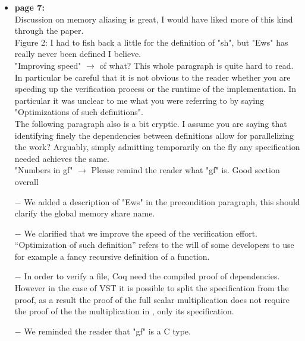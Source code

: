 \begin{itemize}
  \item \textbf{page 7:}\\
        Discussion on memory aliasing is great, I would have liked more of this kind through the paper.\\
        Figure 2: I had to fish back a little for the definition of "sh", but "Ews" has really never been defined I believe.\\
        "Improving speed" $\rightarrow$ of what? This whole paragraph is quite hard to read. In particular be careful that it is not obvious to the reader whether you are speeding up the verification process or the runtime of the implementation. In particular it was unclear to me what you were referring to by saying "Optimizations of such definitions".\\
        The following paragraph also is a bit cryptic. I assume you are saying that identifying finely the dependencies between definitions allow for parallelizing the work? Arguably, simply admitting temporarily on the fly any specification needed  achieves the same.\\
        "Numbers in gf" $\rightarrow$ Please remind the reader what "gf" is. Good section overall
\end{itemize}
\begin{answer}
  \begin{itemize}
    \item[$-$] We added a description of "Ews" in the precondition paragraph, this should clarify the global memory share name.
    \item[$-$] We clarified that we improve the speed of the verification effort. ``Optimization of such definition'' refers to the will of some developers to use for example a fancy recursive definition of a function.
    \item[$-$] In order to verify a file, Coq need the compiled proof of dependencies. However in the case of VST it is possible to split the specification from the proof, as a result the proof of the full scalar multiplication does not require the proof of the the multiplication in , only its specification.
    \item[$-$] We reminded the reader that "gf" is a C type.
  \end{itemize}
\end{answer}

